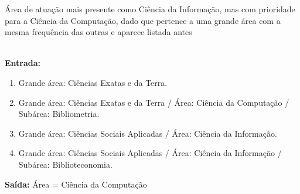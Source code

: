 \begin{apendicesenv}
\begin{example}
Área de atuação mais presente como Ciência da Informação, mas com prioridade para a Ciência da Computação, dado que pertence a uma grande área com a mesma frequência das outras e aparece listada antes
\begin{ABNTEXfontereduzida}
\\ \noindent \textbf{Entrada:}
\begin{enumerate}
  \item Grande área: Ciências Exatas e da Terra. 
  \item Grande área: Ciências Exatas e da Terra / Área: Ciência da Computação / Subárea: Bibliometria.
  \item Grande área: Ciências Sociais Aplicadas / Área: Ciência da Informação.
  \item Grande área: Ciências Sociais Aplicadas / Área: Ciência da Informação / Subárea: Biblioteconomia.
\end{enumerate}

\noindent \textbf{Saída:}
Área = Ciência da Computação
\end{ABNTEXfontereduzida}
\end{example}

\end{apendicesenv}
